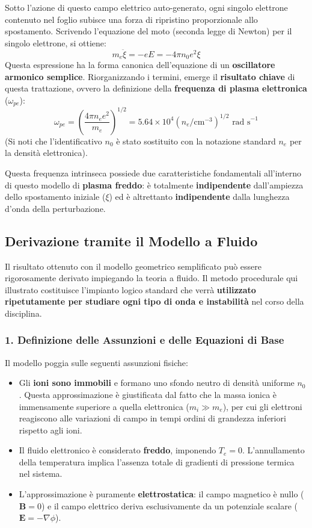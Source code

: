 Sotto l'azione di questo campo elettrico auto-generato, ogni singolo elettrone contenuto nel foglio subisce una forza di ripristino proporzionale allo spostamento. Scrivendo l'equazione del moto (seconda legge di Newton) per il singolo elettrone, si ottiene:
\begin{equation}
m_e \ddot{\xi} = -eE = -4\pi n_0 e^2 \xi
\end{equation}
Questa espressione ha la forma canonica dell'equazione di un \textbf{oscillatore armonico semplice}. Riorganizzando i termini, emerge il \textbf{risultato chiave} di questa trattazione, ovvero la definizione della \textbf{frequenza di plasma elettronica} ($\omega_{pe}$):
\begin{equation}
\omega_{pe} = \left( \frac{4\pi n_e e^2}{m_e} \right)^{1/2} = 5.64 \times 10^4 (n_e / \text{cm}^{-3})^{1/2} \text{ rad s}^{-1}
\end{equation}
(Si noti che l'identificativo $n_0$ è stato sostituito con la notazione standard $n_e$ per la densità elettronica).

Questa frequenza intrinseca possiede due caratteristiche fondamentali all'interno di questo modello di \textbf{plasma freddo}: è totalmente \textbf{indipendente} dall'ampiezza dello spostamento iniziale ($\xi$) ed è altrettanto \textbf{indipendente} dalla lunghezza d'onda della perturbazione.

\subsection{Derivazione tramite il Modello a Fluido}

Il risultato ottenuto con il modello geometrico semplificato può essere rigorosamente derivato impiegando la teoria a fluido. Il metodo procedurale qui illustrato costituisce l'impianto logico standard che verrà \textbf{utilizzato ripetutamente per studiare ogni tipo di onda e instabilità} nel corso della disciplina.

\subsubsection{1. Definizione delle Assunzioni e delle Equazioni di Base}
Il modello poggia sulle seguenti assunzioni fisiche:
\begin{itemize}
\item Gli \textbf{ioni sono immobili} e formano uno sfondo neutro di densità uniforme $n_0$. Questa approssimazione è giustificata dal fatto che la massa ionica è immensamente superiore a quella elettronica ($m_i \gg m_e$), per cui gli elettroni reagiscono alle variazioni di campo in tempi ordini di grandezza inferiori rispetto agli ioni.
\item Il fluido elettronico è considerato \textbf{freddo}, imponendo $T_e = 0$. L'annullamento della temperatura implica l'assenza totale di gradienti di pressione termica nel sistema.
\item L'approssimazione è puramente \textbf{elettrostatica}: il campo magnetico è nullo ($\mathbf{B} = 0$) e il campo elettrico deriva esclusivamente da un potenziale scalare ($\mathbf{E} = -\nabla\phi$).
\end{itemize}

